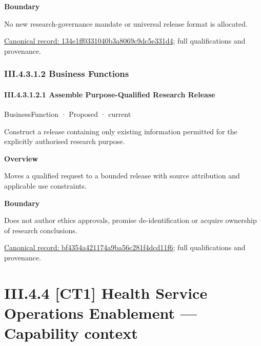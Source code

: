 \textbf{Boundary}



No new research-governance mandate or universal release format is allocated.


{\footnotesize \href{../../../../../../../continuum/business/business-service/134e1ff0331040b3a8069c9dc5e331d4.md}{Canonical record: 134e1ff0331040b3a8069c9dc5e331d4}; full qualifications and provenance.}\par
\subsubsection*{III.4.3.1.2 Business Functions}
\label{navigation:III.4.3.1.2}

\paragraph*{III.4.3.1.2.1 Assemble Purpose-Qualified Research Release}
\label{navigation:III.4.3.1.2.1}

\label{element:bf4354a421174a9ba56c281f4dcd11f6}
{\small BusinessFunction · Proposed · current}\par

Construct a release containing only existing information permitted for the explicitly authorised research purpose.



\textbf{Overview}



Moves a qualified request to a bounded release with source attribution and applicable use constraints.



\textbf{Boundary}



Does not author ethics approvals, promise de-identification or acquire ownership of research conclusions.


{\footnotesize \href{../../../../../../../continuum/business/business-function/bf4354a421174a9ba56c281f4dcd11f6.md}{Canonical record: bf4354a421174a9ba56c281f4dcd11f6}; full qualifications and provenance.}\par
\section*{III.4.4 [CT1] Health Service Operations Enablement — Capability context}
\label{navigation:III.4.4}

